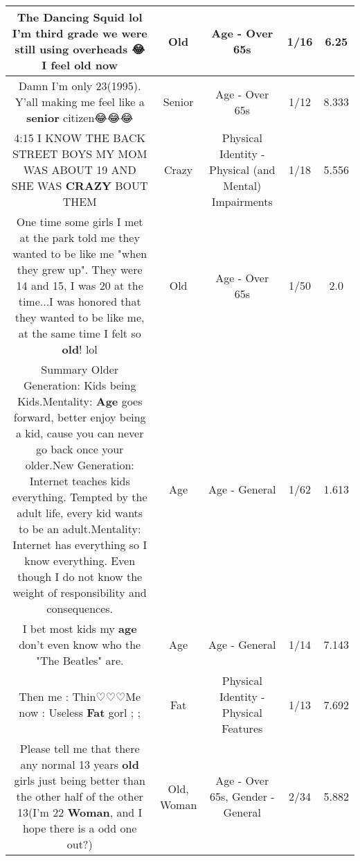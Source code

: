 \documentclass[11pt]{article}
\newlength\mylength
\begin{document}
\begin{center}
\begin{longtable}{|C{.65\mylength}|C{.30\mylength}|C{.12\mylength}|C{.12\mylength}|C{.12\mylength}|}
  \small The Dancing  Squid lol I'm third grade we were still using overheads 😂 I feel \textbf{old} now\normalsize   & Old & Age - Over 65s & 1/16 & 6.25 \\  \hline
  \small Damn I'm only 23(1995). Y'all making me feel like a \textbf{senior} citizen😂😂😂\normalsize   & Senior & Age - Over 65s & 1/12 & 8.333 \\  \hline
  \small 4:15 I KNOW THE BACK STREET BOYS MY MOM WAS ABOUT 19 AND SHE WAS \textbf{CRAZY} BOUT THEM\normalsize   & Crazy & Physical Identity - Physical (and Mental) Impairments & 1/18 & 5.556 \\  \hline
  \small One time some girls I met at the park told me they wanted to be like me "when they grew up". They were 14 and 15, I was 20 at the time...I was honored that they wanted to be like me, at the same time I felt so \textbf{old}! lol\normalsize   & Old & Age - Over 65s & 1/50 & 2.0 \\  \hline
  \small Summary Older Generation: Kids being Kids.Mentality: \textbf{Age} goes forward, better enjoy being a kid, cause you can never go back once your older.New Generation: Internet teaches kids everything. Tempted by the adult life, every kid wants to be an adult.Mentality: Internet has everything so I know everything. Even though I do not know the weight of responsibility and consequences.\normalsize   & Age & Age - General & 1/62 & 1.613 \\  \hline
  \small I bet most kids my \textbf{age} don't even know who the "The Beatles" are.\normalsize   & Age & Age - General & 1/14 & 7.143 \\  \hline
  \small Then me : Thin♡♡♡Me now : Useless \textbf{Fat} gorl ;   ;\normalsize   & Fat & Physical Identity - Physical Features & 1/13 & 7.692 \\  \hline
  \small Please tell me that there any normal 13 years \textbf{old} girls just being better than the other half of the other 13(I'm 22 \textbf{Woman}, and I hope there is a odd one out?)\normalsize   & Old, Woman & Age - Over 65s, Gender - General & 2/34 & 5.882 \\  \hline

\end{longtable}
\end{center}
\end{document}
